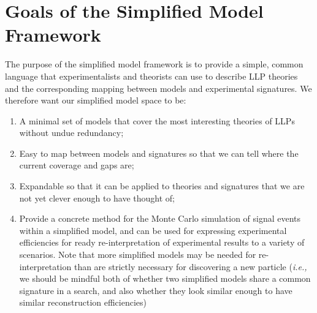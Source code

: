 \section{Goals of the Simplified Model Framework}
The purpose of the simplified model framework is to provide a simple, common language that experimentalists and theorists can use to describe LLP theories and the corresponding mapping between models and experimental signatures. We therefore want our simplified model space to be:
%
\begin{enumerate}
\item A minimal set of models that cover the most interesting theories of LLPs without undue redundancy;
\item Easy to map between models and signatures so that we can tell where the current coverage and gaps are;
\item Expandable so that it can be applied to theories and signatures that we are not yet clever enough to have thought of;
\item Provide a concrete method for the Monte Carlo simulation of signal events within a simplified model, and can be used for expressing experimental efficiencies for ready re-interpretation of experimental results to a variety of scenarios. Note that more simplified models may be needed for  re-interpretation than are strictly necessary for discovering a new particle (\emph{i.e.,} we should be mindful both of whether two simplified models share a common signature in a search, and also whether they  look similar enough to have similar reconstruction efficiencies)
\end{enumerate}

